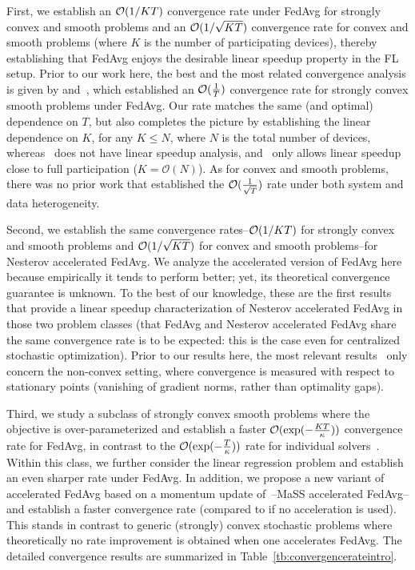 First, we establish an {\small{${\mathcal{O}}(1/KT)$}} convergence rate  under FedAvg for strongly convex and smooth problems and  an
{\small{${\mathcal{O}}(1/\sqrt{KT})$}} convergence rate for convex
and smooth problems (where $K$ is the number of participating devices), thereby establishing that FedAvg enjoys the desirable linear speedup property in the FL setup. Prior to our work here, the best and the most related convergence analysis is given by \cite{li2019convergence} and~\cite{karimireddy2019scaffold}, which established an ${\mathcal{O}}(\frac{1}{T})$ convergence rate for strongly convex smooth problems under FedAvg. Our rate matches the same (and optimal) dependence on $T$, but also completes the picture by establishing the linear dependence on $K$, for any $K\leq N$, where $N$ is the total number of devices, whereas~\cite{li2019convergence} does not have linear speedup analysis, and~\cite{karimireddy2019scaffold} only allows linear speedup close to full participation ($K=\mathcal{O}(N)$). As for convex and smooth problems, there was no prior work that established the {\small{${\mathcal{O}}(\frac{1}{\sqrt{T}})$}} rate under both system and data heterogeneity.

Second, we establish the same convergence rates--{\small{${\mathcal{O}}(1/KT)$}} for strongly convex and smooth problems and {\small{${\mathcal{O}}(1/\sqrt{KT})$}} for convex and smooth problems--for Nesterov accelerated FedAvg. 
We analyze the accelerated version of FedAvg here because empirically it tends to perform better; yet, its theoretical convergence guarantee is unknown. To the best of our knowledge, these are the first results that provide a linear speedup characterization of Nesterov accelerated FedAvg in those two problem classes (that FedAvg and Nesterov accelerated FedAvg share the same convergence rate is to be expected: this is the case even for centralized stochastic optimization). Prior to our results here, the most relevant results~\cite{yu2019linear} only concern the non-convex setting, where convergence is measured with respect to stationary points (vanishing of gradient norms, rather than optimality gaps).

Third, we study a subclass of strongly convex smooth problems where the objective is over-parameterized and establish 
a faster ${\mathcal{O}}(\exp(-\frac{KT}{\kappa}))$ convergence rate for FedAvg, in contrast to the ${\mathcal{O}}(\exp(-\frac{T}{\kappa}))$ rate for individual solvers~\cite{ma2017power}. Within this class, we further consider the linear regression problem and establish an even sharper rate under FedAvg. In addition, we propose a new variant of accelerated FedAvg based on a momentum update of~\cite{liu2018accelerating}--MaSS accelerated FedAvg--and establish a faster convergence rate (compared to if no acceleration is used). This stands in contrast to generic (strongly) convex stochastic problems where theoretically no rate improvement is obtained when one accelerates FedAvg.
The detailed convergence results are summarized in Table~\ref{tb:convergencerateintro}.


